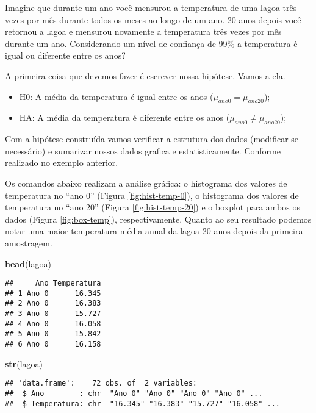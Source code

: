 \documentclass[14pt,titlepage, oneside, openany, a4paper]{book}
\newenvironment{Shaded}{\begin{snugshade}}{\end{snugshade}}
\newcommand{\KeywordTok}[1]{\textcolor[rgb]{0.13,0.29,0.53}{\textbf{#1}}}
\newcommand{\NormalTok}[1]{#1}
\providecommand{\tightlist}{%
  \setlength{\itemsep}{0pt}\setlength{\parskip}{0pt}}
\begin{document}
Imagine que durante um ano você mensurou a temperatura de uma lagoa três vezes por mês durante todos os meses ao longo de um ano. 20 anos depois você retornou a lagoa e mensurou novamente a temperatura três vezes por mês durante um ano. Considerando um nível de confiança de 99\% a temperatura é igual ou diferente entre os anos?

A primeira coisa que devemos fazer é escrever nossa hipótese. Vamos a ela.

\begin{itemize}
\tightlist
\item
  H0: A média da temperatura é igual entre os anos (\(\mu_{ano0} = \mu_{ano 20}\));
\item
  HA: A média da temperatura é diferente entre os anos (\(\mu_{ano0} \neq \mu_{ano 20}\));
\end{itemize}

Com a hipótese construída vamos verificar a estrutura dos dados (modificar se necessário) e sumarizar nossos dados grafica e estatisticamente. Conforme realizado no exemplo anterior.

Os comandos abaixo realizam a análise gráfica: o histograma dos valores de temperatura no ``ano 0'' (Figura \ref{fig:hist-temp-0}), o histograma dos valores de temperatura no ``ano 20'' (Figura \ref{fig:hist-temp-20}) e o boxplot para ambos os dados (Figura \ref{fig:box-temp}), respectivamente. Quanto ao seu resultado podemos notar uma maior temperatura média anual da lagoa 20 anos depois da primeira amostragem.

\begin{Shaded}
\begin{Highlighting}[]
\KeywordTok{head}\NormalTok{(lagoa)}
\end{Highlighting}
\end{Shaded}

\begin{verbatim}
##     Ano Temperatura
## 1 Ano 0      16.345
## 2 Ano 0      16.383
## 3 Ano 0      15.727
## 4 Ano 0      16.058
## 5 Ano 0      15.842
## 6 Ano 0      16.158
\end{verbatim}

\begin{Shaded}
\begin{Highlighting}[]
\KeywordTok{str}\NormalTok{(lagoa)}
\end{Highlighting}
\end{Shaded}

\begin{verbatim}
## 'data.frame':    72 obs. of  2 variables:
##  $ Ano        : chr  "Ano 0" "Ano 0" "Ano 0" "Ano 0" ...
##  $ Temperatura: chr  "16.345" "16.383" "15.727" "16.058" ...
\end{verbatim}
\end{document}
